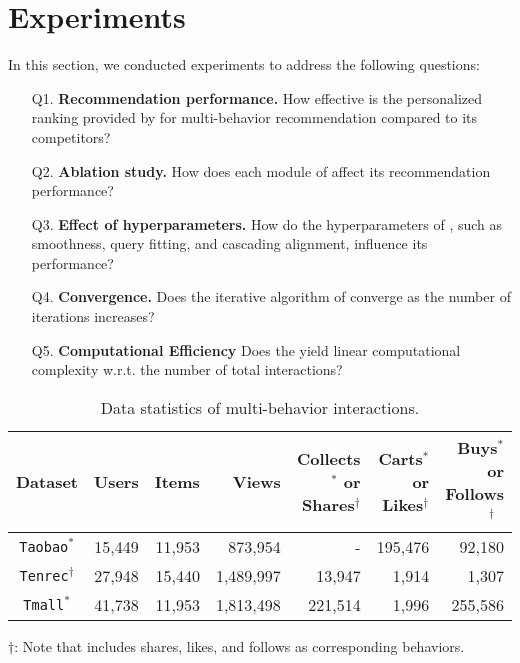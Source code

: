 \section{Experiments}
\label{sec:experiments}
In this section, we conducted experiments to address the following questions:

\begin{enumerate}[leftmargin=9mm,noitemsep]
    \item[Q1.] {
        \textbf{Recommendation performance. } 
        How effective is the personalized ranking provided by \method for multi-behavior recommendation compared to its competitors?
    }
    \item[Q2.] {
        \textbf{Ablation study.} How does each module of \method affect its recommendation performance?
    }
    \item[Q3.] {
        \textbf{Effect of hyperparameters.} 
        How do the hyperparameters of \method, such as smoothness, query fitting, and cascading alignment, influence its performance?
    }
    \item[Q4.] {
        \textbf{Convergence.} 
        Does the iterative algorithm of \method converge as the number of iterations increases?
    }
    \item[Q5.] {
        \textbf{Computational Efficiency} Does the \method yield linear computational complexity w.r.t. the number of total interactions?
    }
\end{enumerate}

\def\arraystretch{1.1} 
\setlength{\tabcolsep}{12pt}
\begin{table}[t]
\small
\caption{
    Data statistics of multi-behavior interactions.
}
\label{tab:data}
\centering
\begin{tabular}{crrrrrr}
    \hline
    \toprule
    \textbf{Dataset} & Users & Items & Views& 
    \makecell[r]{Collects$^{*}$\\or Shares$^{\dagger}$}
     & \makecell[r]{Carts$^{*}$\\or Likes$^{\dagger}$} & \makecell[r]{Buys$^{*}$\\or Follows$^{\dagger}$}\ \\
    \midrule
    \texttt{Taobao}$^{*}$ & 15,449 & 11,953 & 873,954 & - & 195,476  & 92,180 \\
    \texttt{Tenrec}$^{\dagger}$ & 27,948 & 15,440 & 1,489,997  & 13,947  & 1,914  & 1,307  \\
    \texttt{Tmall}$^{*}$ & 41,738 & 11,953 & 1,813,498  & 221,514 & 1,996  & 255,586 \\
    \bottomrule
    \hline
\end{tabular}
\begin{tablenotes}[flushleft]\footnotesize
{\item[] $\dagger$: Note that \tenrec includes shares, likes, and follows as corresponding behaviors.}
\end{tablenotes}
\end{table}

